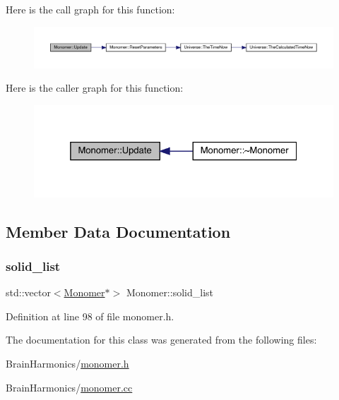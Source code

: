 Here is the call graph for this function\+:
\nopagebreak
\begin{figure}[H]
\begin{center}
\leavevmode
\includegraphics[width=350pt]{class_monomer_a48dc2ffb5da8cf3dc3f4f56bba674de6_cgraph}
\end{center}
\end{figure}
Here is the caller graph for this function\+:
\nopagebreak
\begin{figure}[H]
\begin{center}
\leavevmode
\includegraphics[width=325pt]{class_monomer_a48dc2ffb5da8cf3dc3f4f56bba674de6_icgraph}
\end{center}
\end{figure}


\subsection{Member Data Documentation}
\mbox{\label{class_monomer_ad792aeb859c72edbb17414bf00b8fd12}} 
\subsubsection{\texorpdfstring{solid\+\_\+list}{solid\_list}}
{\footnotesize\ttfamily std\+::vector$<$\hyperlink{class_monomer}{Monomer}$\ast$$>$ Monomer\+::solid\+\_\+list\hspace{0.3cm}{\ttfamily [protected]}}



Definition at line 98 of file monomer.\+h.



The documentation for this class was generated from the following files\+:\begin{DoxyCompactItemize}
\item 
Brain\+Harmonics/\hyperlink{monomer_8h}{monomer.\+h}\item 
Brain\+Harmonics/\hyperlink{monomer_8cc}{monomer.\+cc}\end{DoxyCompactItemize}
